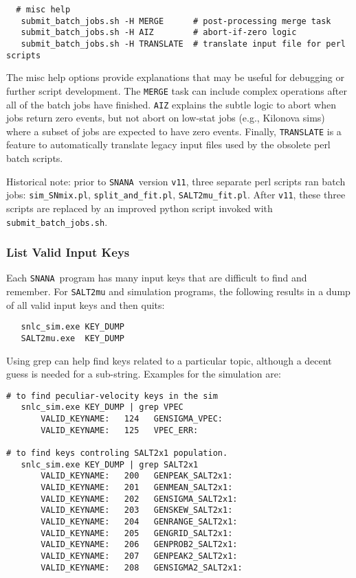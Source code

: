 \documentclass[12pt]{article}
\newcommand{\snana}{{\tt SNANA}}
\newcommand{\SNmix}{\tt sim\_SNmix.pl}
\newcommand{\splitFit}{\tt split\_and\_fit.pl}
\newcommand{\submit}{\tt submit\_batch\_jobs.sh}
\begin{document}
{\begin{verbatim}
  # misc help
   submit_batch_jobs.sh -H MERGE      # post-processing merge task
   submit_batch_jobs.sh -H AIZ        # abort-if-zero logic
   submit_batch_jobs.sh -H TRANSLATE  # translate input file for perl scripts
\end{verbatim}
The misc help options provide explanations that may be useful for debugging
or further script development.
The {\tt MERGE} task can include complex operations after all of the
batch jobs have finished. {\tt AIZ} explains the subtle logic to 
abort when jobs return zero events, but not abort on low-stat jobs
(e.g., Kilonova sims) where a subset of jobs are expected to have zero events.
Finally, {\tt TRANSLATE} is a feature to automatically translate
legacy input files used by the obsolete perl batch scripts.

\medskip
Historical note: prior to \snana\ version {\tt v11},
three separate perl scripts ran batch jobs: 
{\SNmix}, {\splitFit}, {\tt SALT2mu\_fit.pl}.
After {\tt v11}, these three scripts are replaced by
an improved python script invoked with {\submit}.

  \subsubsection{List Valid Input Keys}
  \label{sss:KEY_DUMP}

Each \snana\ program has many input keys that are difficult to find 
and remember. For {\tt SALT2mu} and simulation programs, the following
results in a dump of all valid input keys and then quits:
\begin{verbatim}
   snlc_sim.exe KEY_DUMP
   SALT2mu.exe  KEY_DUMP
\end{verbatim} 
Using grep can help find keys related to a particular topic,
although a decent guess is needed for a sub-string.
Examples for the simulation are:
\begin{verbatim}
# to find peculiar-velocity keys in the sim
   snlc_sim.exe KEY_DUMP | grep VPEC
       VALID_KEYNAME:   124   GENSIGMA_VPEC:  
       VALID_KEYNAME:   125   VPEC_ERR:  

# to find keys controling SALT2x1 population.
   snlc_sim.exe KEY_DUMP | grep SALT2x1
       VALID_KEYNAME:   200   GENPEAK_SALT2x1:  
       VALID_KEYNAME:   201   GENMEAN_SALT2x1:  
       VALID_KEYNAME:   202   GENSIGMA_SALT2x1:  
       VALID_KEYNAME:   203   GENSKEW_SALT2x1:  
       VALID_KEYNAME:   204   GENRANGE_SALT2x1:  
       VALID_KEYNAME:   205   GENGRID_SALT2x1:  
       VALID_KEYNAME:   206   GENPROB2_SALT2x1:  
       VALID_KEYNAME:   207   GENPEAK2_SALT2x1:  
       VALID_KEYNAME:   208   GENSIGMA2_SALT2x1:    
\end{verbatim}


}
\end{document}
